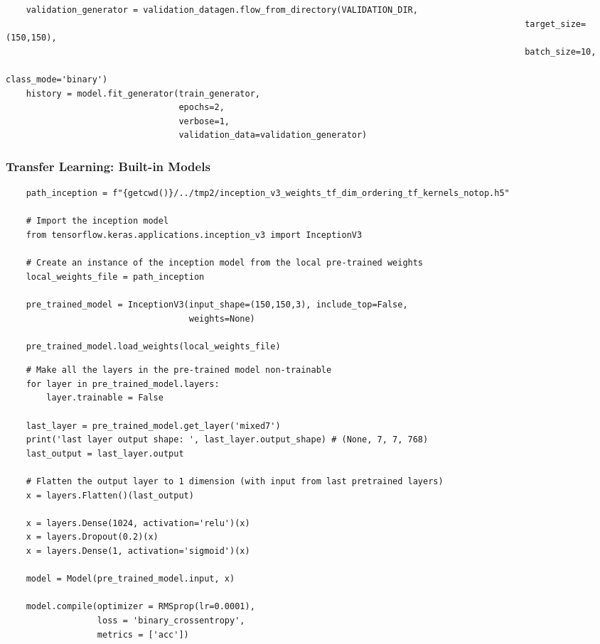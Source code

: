 \documentclass[11pt, a4paper]{article}
\begin{document}
\begin{spacing}{1.1}
\begin{lstlisting}
	validation_generator = validation_datagen.flow_from_directory(VALIDATION_DIR,
																			                          target_size=(150,150),
																			                          batch_size=10,
																			                          class_mode='binary')
	history = model.fit_generator(train_generator,
	                              epochs=2,
	                              verbose=1,
	                              validation_data=validation_generator)  \end{lstlisting} \vspace*{4mm}
	                             
	\subsubsection{Transfer Learning: Built-in Models}
	\begin{lstlisting}
	path_inception = f"{getcwd()}/../tmp2/inception_v3_weights_tf_dim_ordering_tf_kernels_notop.h5"
	
	# Import the inception model  
	from tensorflow.keras.applications.inception_v3 import InceptionV3
	
	# Create an instance of the inception model from the local pre-trained weights
	local_weights_file = path_inception
	
	pre_trained_model = InceptionV3(input_shape=(150,150,3), include_top=False, 
	                                weights=None)
	
	pre_trained_model.load_weights(local_weights_file) \end{lstlisting} \newpage

	\begin{lstlisting}
	# Make all the layers in the pre-trained model non-trainable
	for layer in pre_trained_model.layers:
		layer.trainable = False
		
	last_layer = pre_trained_model.get_layer('mixed7')
	print('last layer output shape: ', last_layer.output_shape) # (None, 7, 7, 768)
	last_output = last_layer.output	
	
	# Flatten the output layer to 1 dimension (with input from last pretrained layers)
	x = layers.Flatten()(last_output)
	
	x = layers.Dense(1024, activation='relu')(x)
	x = layers.Dropout(0.2)(x)                  
	x = layers.Dense(1, activation='sigmoid')(x)           
	
	model = Model(pre_trained_model.input, x) 
	
	model.compile(optimizer = RMSprop(lr=0.0001), 
	              loss = 'binary_crossentropy', 
	              metrics = ['acc']) \end{lstlisting} \vspace*{4mm}
	             

\end{spacing}
\end{document}

